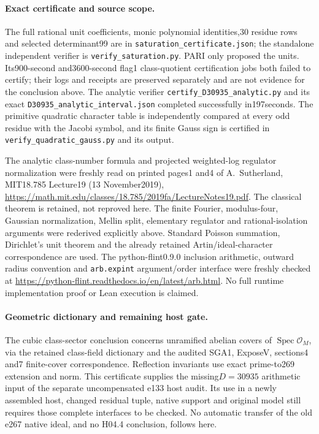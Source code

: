 \paragraph{Exact certificate and source scope.}
The full rational unit coefficients, monic polynomial identities,30 residue
rows and selected determinant99 are in
\texttt{saturation\_certificate.json}; the standalone independent verifier
is \texttt{verify\_saturation.py}.  PARI only proposed the units.
Its900-second and3600-second flag1 class-quotient certification jobs both
failed to certify;
their logs and receipts are preserved separately and are not evidence
for the conclusion above.
The analytic verifier \texttt{certify\_D30935\_analytic.py} and its exact
\texttt{D30935\_analytic\_interval.json} completed successfully in197seconds.
The primitive quadratic character table is independently compared at every
odd residue with the Jacobi symbol, and its finite Gauss sign is certified
in \texttt{verify\_quadratic\_gauss.py} and its output.

The analytic class-number formula and projected weighted-log regulator
normalization were freshly read on printed pages1 and4 of
A.~Sutherland, MIT18.785 Lecture19 (13 November2019),
\url{https://math.mit.edu/classes/18.785/2019fa/LectureNotes19.pdf}.
The classical theorem is retained, not reproved here.
The finite Fourier, modulus-four, Gaussian normalization, Mellin split,
elementary regulator and rational-isolation arguments were rederived
explicitly above.  Standard Poisson summation, Dirichlet's unit theorem
and the already retained Artin/ideal-character correspondence are used.
The python-flint0.9.0 inclusion arithmetic, outward radius convention and
\texttt{arb.expint} argument/order interface were freshly checked at
\url{https://python-flint.readthedocs.io/en/latest/arb.html}.
No full runtime implementation proof or Lean execution is claimed.

\paragraph{Geometric dictionary and remaining host gate.}
The cubic class-sector conclusion concerns unramified abelian covers of
$\operatorname{Spec}\mathcal O_M$, via the retained class-field dictionary
and the audited SGA1, ExposeV, sections4 and7 finite-cover correspondence.
Reflection invariants use exact prime-to269 extension and norm.
This certificate supplies the missing$D=30935$ arithmetic input of the
separate uncompensated e133 host audit.  Its use in a newly assembled
host, changed residual tuple, native support and original model still
requires those complete interfaces to be checked.  No automatic transfer
of the old e267 native ideal, and no H04.4 conclusion, follows here.

